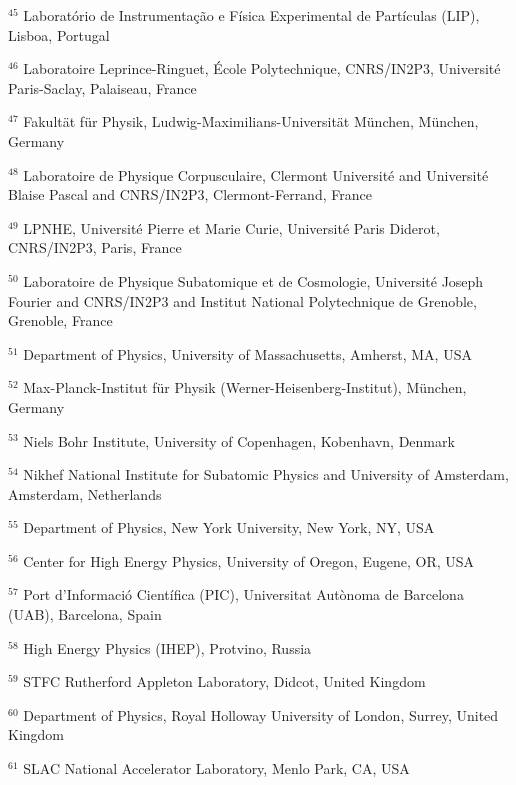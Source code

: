 \par {\footnotesize $^{45}$ Laboratório de Instrumentação e Física Experimental de Partículas (LIP), Lisboa, Portugal}
\par {\footnotesize $^{46}$ Laboratoire Leprince-Ringuet, École Polytechnique, CNRS/IN2P3, Université Paris-Saclay, Palaiseau, France}
\par {\footnotesize $^{47}$ Fakultät für Physik, Ludwig-Maximilians-Universität München, München, Germany}
\par {\footnotesize $^{48}$ Laboratoire de Physique Corpusculaire, Clermont Université and Université Blaise Pascal and CNRS/IN2P3, Clermont-Ferrand, France}
\par {\footnotesize $^{49}$ LPNHE, Université Pierre et Marie Curie, Université Paris Diderot, CNRS/IN2P3, Paris, France}
\par {\footnotesize $^{50}$ Laboratoire de Physique Subatomique et de Cosmologie, Université Joseph Fourier and CNRS/IN2P3 and Institut National Polytechnique de Grenoble, Grenoble, France}
\par {\footnotesize $^{51}$ Department of Physics, University of Massachusetts, Amherst, MA, USA}
\par {\footnotesize $^{52}$ Max-Planck-Institut für Physik (Werner-Heisenberg-Institut), München, Germany}
\par {\footnotesize $^{53}$ Niels Bohr Institute, University of Copenhagen, Kobenhavn, Denmark}
\par {\footnotesize $^{54}$ Nikhef National Institute for Subatomic Physics and University of Amsterdam, Amsterdam, Netherlands}
\par {\footnotesize $^{55}$ Department of Physics, New York University, New York, NY, USA}
\par {\footnotesize $^{56}$ Center for High Energy Physics, University of Oregon, Eugene, OR, USA}
\par {\footnotesize $^{57}$ Port d’Informació Científica (PIC), Universitat Autònoma de Barcelona (UAB), Barcelona, Spain}
\par {\footnotesize $^{58}$ High Energy Physics (IHEP), Protvino, Russia}
\par {\footnotesize $^{59}$ STFC Rutherford Appleton Laboratory, Didcot, United Kingdom}
\par {\footnotesize $^{60}$ Department of Physics, Royal Holloway University of London, Surrey, United Kingdom}
\par {\footnotesize $^{61}$ SLAC National Accelerator Laboratory, Menlo Park, CA, USA}
